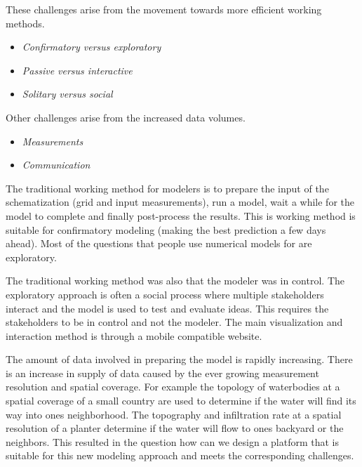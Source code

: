 \documentclass[a4paper]{article}
\begin{document}
These challenges arise from the movement towards more efficient working methods.
\begin{itemize}
\item \emph{Confirmatory versus exploratory}  \cite{Baart2013}
\item \emph{Passive versus interactive}
\item \emph{Solitary versus social}
\end{itemize}

Other challenges arise from the increased data volumes.
\begin{itemize}
  \item \emph{Measurements}
  \item \emph{Communication}
\end{itemize}



The traditional working method for modelers is to prepare the input of the schematization (grid and input measurements), run a model, wait a while for the model to complete and finally post-process the results. This is working method is suitable for confirmatory modeling (making the best prediction a few days ahead). Most of the questions that people use numerical models for are exploratory.

The traditional working method was also that the modeler was in control. The exploratory approach is often a social process where multiple stakeholders interact and the model is used to test and evaluate ideas. This requires the stakeholders to be in control and not the modeler. The main visualization and interaction method is through a mobile compatible website.

The amount of data involved in preparing the model is rapidly increasing. There is an increase in supply of data caused by the ever growing measurement resolution and spatial coverage. For example the topology of waterbodies at a spatial coverage of a small country are used to determine if the water will find its way into ones neighborhood. The topography and infiltration rate at a spatial resolution of a planter determine if the water will flow to ones backyard or the neighbors.
This resulted in the question how can we design a platform that is suitable for this new modeling approach and meets the corresponding challenges.
\end{document}
